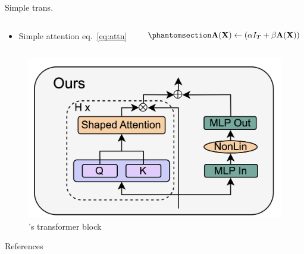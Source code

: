\documentclass[aspectratio=32]{beamer}
\providecommand{\tightlist}{\setlength{\itemsep}{0pt}\setlength{\parskip}{0pt}}
\begin{document}
  \begin{frame}[allowframebreaks]{\textbar{} Simple trans. \autocite{he2023}}
  \begin{columns}[c]
  \begin{column}{0.48\textwidth}
  \begin{itemize}
  \tightlist
  \item
    Simple attention eq.~\ref{eq:attn}
  \end{itemize}
  \end{column}

  \begin{column}{0.48\textwidth}
  \begin{equation}\phantomsection\label{eq:attn}{\textbf{A}(\textbf{X}) \leftarrow (\alpha I_T + \beta \textbf{A}(\textbf{X}))}\end{equation}
  \end{column}
  \end{columns}

  \framebreak

  \begin{figure}
  \centering
  \includegraphics{attn.png}
  \caption{\textcite{he2023}'s transformer block}
  \end{figure}
  \end{frame}

  
\begin{frame}[allowframebreaks]
  \Large{References}
  \small\linespread{1.2}\printbibliography
\end{frame}
\end{document}
